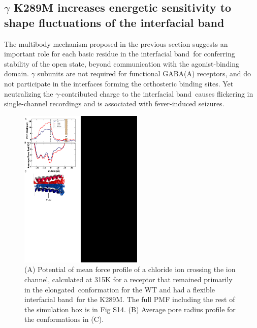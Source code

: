 \documentclass[journal=jacsat,manuscript=article]{achemso}
\newcommand{\SFullABF}{S14}
\newcommand{\fivering}{interfacial band~}
\newcommand{\fiveringnos}{interfacial band}
\newcommand{\extended}{elongated~}
\newcommand{\flip}{flip~}
\newcommand{\muthotmovie}{2}
\newcommand{\WT}{WT\xspace}
\newcommand{\MT}{K289M\xspace}
\begin{document}
\subsection*{$\gamma$ K289M increases energetic sensitivity to shape fluctuations of the \fiveringnos} The multibody mechanism proposed in the previous section suggests an important role for each basic residue in the \fivering for conferring stability of the open state, beyond communication with the agonist-binding domain.  $\gamma$ subunits are not required for functional GABA(A) receptors, and do not participate in the interfaces forming the orthosteric binding sites. %
Yet neutralizing the $\gamma$-contributed charge to the \fivering causes flickering in single-channel recordings \cite{Bianchi2002}  and is associated with fever-induced seizures. %

\begin{figure}[t]
\centering
\includegraphics[height = 3in]{figures_2/pillar_4_ABF_2}
\caption{ (A) Potential of mean force profile of a chloride ion crossing the ion channel, calculated at 315K for a receptor that remained primarily in the \extended conformation for the \WT and had a flexible \fivering for the \MT. The full PMF including the rest of the simulation box is in Fig \SFullABF. (B) Average pore radius profile for the conformations in (C).}
\label{fig:abf}\label{fig:pore-profile}
\end{figure}
\end{document}
